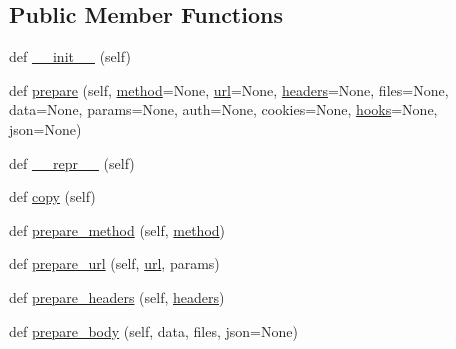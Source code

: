 \subsection*{Public Member Functions}
\begin{DoxyCompactItemize}
\item 
def \hyperlink{classpip_1_1__vendor_1_1requests_1_1models_1_1PreparedRequest_aded2c1456d9f4ff61fc212e0d930e92f}{\+\_\+\+\_\+init\+\_\+\+\_\+} (self)
\item 
def \hyperlink{classpip_1_1__vendor_1_1requests_1_1models_1_1PreparedRequest_a7ee07dc37ee778eb3c635eb6e5bfe22d}{prepare} (self, \hyperlink{classpip_1_1__vendor_1_1requests_1_1models_1_1PreparedRequest_a417fd0bec96e2be4f03ee908dabb07c8}{method}=None, \hyperlink{classpip_1_1__vendor_1_1requests_1_1models_1_1PreparedRequest_af848e89a53867307f151d0be189067b2}{url}=None, \hyperlink{classpip_1_1__vendor_1_1requests_1_1models_1_1PreparedRequest_a58790d14c0978a1c297be5659606f7a1}{headers}=None, files=None, data=None, params=None, auth=None, cookies=None, \hyperlink{classpip_1_1__vendor_1_1requests_1_1models_1_1PreparedRequest_abde9f91f43f3ebc0b4da5ea4fd75a7cb}{hooks}=None, json=None)
\item 
def \hyperlink{classpip_1_1__vendor_1_1requests_1_1models_1_1PreparedRequest_aaffb2d77942451dc425721a88a0c3435}{\+\_\+\+\_\+repr\+\_\+\+\_\+} (self)
\item 
def \hyperlink{classpip_1_1__vendor_1_1requests_1_1models_1_1PreparedRequest_a5b5d99f03817bf8a966f5e83fcd099d3}{copy} (self)
\item 
def \hyperlink{classpip_1_1__vendor_1_1requests_1_1models_1_1PreparedRequest_ab11615f255e35299a3f279b863b1d164}{prepare\+\_\+method} (self, \hyperlink{classpip_1_1__vendor_1_1requests_1_1models_1_1PreparedRequest_a417fd0bec96e2be4f03ee908dabb07c8}{method})
\item 
def \hyperlink{classpip_1_1__vendor_1_1requests_1_1models_1_1PreparedRequest_a6a1e754d736fc26f2b414f6d103a6550}{prepare\+\_\+url} (self, \hyperlink{classpip_1_1__vendor_1_1requests_1_1models_1_1PreparedRequest_af848e89a53867307f151d0be189067b2}{url}, params)
\item 
def \hyperlink{classpip_1_1__vendor_1_1requests_1_1models_1_1PreparedRequest_a6165dd3dd57ddffd65cf614e00dd9abd}{prepare\+\_\+headers} (self, \hyperlink{classpip_1_1__vendor_1_1requests_1_1models_1_1PreparedRequest_a58790d14c0978a1c297be5659606f7a1}{headers})
\item 
def \hyperlink{classpip_1_1__vendor_1_1requests_1_1models_1_1PreparedRequest_a7472ea188a3bb7fa5bb534e48586a722}{prepare\+\_\+body} (self, data, files, json=None)

\end{DoxyCompactItemize}
